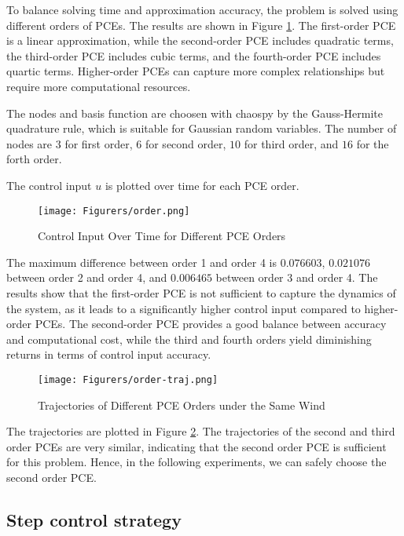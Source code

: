 To balance solving time and approximation accuracy, the problem is solved using different orders of PCEs. The results are shown in Figure \ref{fig:order}. The first-order PCE is a linear approximation, while the second-order PCE includes quadratic terms, the third-order PCE includes cubic terms, and the fourth-order PCE includes quartic terms. Higher-order PCEs can capture more complex relationships but require more computational resources.

The nodes and basis function are choosen with chaospy \cite{FEINBERG201546} by the Gauss-Hermite quadrature rule, which is suitable for Gaussian random variables. The number of nodes are $3$ for first order, $6$ for second order, $10$ for third order, and $16$ for the forth order. 

The control input $u$ is plotted over time for each PCE order.

\begin{figure}[h!]
    \centering
    \texttt{[image: Figurers/order.png]}
    \caption{Control Input Over Time for Different PCE Orders}
    \label{fig:order}
\end{figure}

The maximum difference between order 1 and order 4 is $0.076603$, $0.021076$ between order 2 and order 4, and $0.006465$ between order 3 and order 4. The results show that the first-order PCE is not sufficient to capture the dynamics of the system, as it leads to a significantly higher control input compared to higher-order PCEs. The second-order PCE provides a good balance between accuracy and computational cost, while the third and fourth orders yield diminishing returns in terms of control input accuracy.
\begin{figure}
    \centering
    \texttt{[image: Figurers/order-traj.png]}
    \caption{Trajectories of Different PCE Orders under the Same Wind}
    \label{fig:order-traj}
\end{figure}

The trajectories are plotted in Figure \ref{fig:order-traj}. The trajectories of the second and third order PCEs are very similar, indicating that the second order PCE is sufficient for this problem. Hence, in the following experiments, we can safely choose the second order PCE.

\subsection{Step control strategy}


